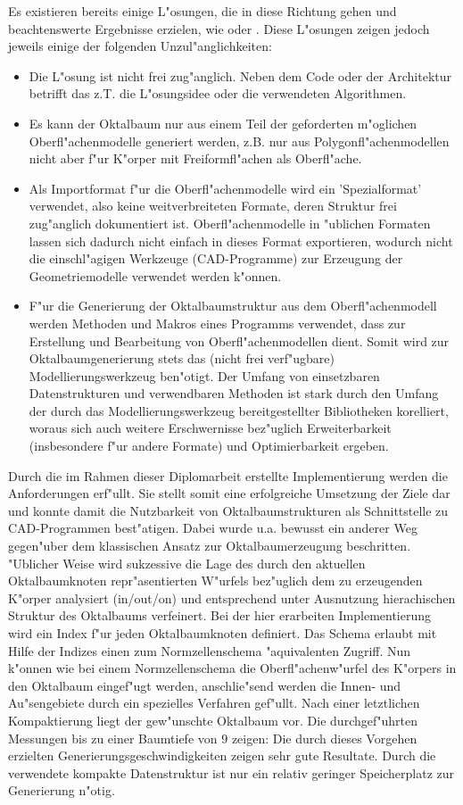 Es existieren bereits einige L"osungen, die in diese Richtung gehen und 
beachtenswerte Ergebnisse erzielen, wie \cite{dipl_anw_oct} oder
\cite{konvex_polygon_anw_oct}.
Diese L"osungen zeigen jedoch jeweils einige der folgenden
Unzul"anglichkeiten:
\begin{itemize}
\item Die L"osung ist nicht frei zug"anglich. Neben dem Code oder der 
    Architektur betrifft das z.T. die L"osungsidee oder die verwendeten
    Algorithmen.
\item Es kann der Oktalbaum nur aus einem Teil der geforderten m"oglichen 
    Oberfl"achenmodelle generiert werden, z.B. nur aus Polygonfl"achenmodellen 
    nicht aber f"ur K"orper mit Freiformfl"achen als Oberfl"ache.
\item Als Importformat f"ur die Oberfl"achenmodelle wird ein 'Spezialformat'
    verwendet, also keine weitverbreiteten Formate, deren Struktur frei 
    zug"anglich dokumentiert ist. Oberfl"achenmodelle in "ublichen Formaten 
    lassen sich dadurch nicht einfach in dieses Format exportieren, wodurch
    nicht die einschl"agigen Werkzeuge (CAD-Programme) zur Erzeugung der 
    Geometriemodelle verwendet werden k"onnen.
\item F"ur die Generierung der Oktalbaumstruktur aus dem Oberfl"achenmodell 
    werden Methoden und Makros eines Programms verwendet, dass zur Erstellung 
    und Bearbeitung von Oberfl"achenmodellen dient. Somit wird zur 
    Oktalbaumgenerierung stets das (nicht frei verf"ugbare) 
    Modellierungswerkzeug ben"otigt. Der Umfang von einsetzbaren 
    Datenstrukturen und verwendbaren Methoden ist stark durch den Umfang
    der durch das Modellierungswerkzeug bereitgestellter Bibliotheken
    korelliert, woraus sich auch weitere Erschwernisse bez"uglich 
    Erweiterbarkeit (insbesondere f"ur andere Formate) und Optimierbarkeit
    ergeben.
\end{itemize}
Durch die im Rahmen dieser Diplomarbeit erstellte Implementierung werden die 
Anforderungen erf"ullt. Sie stellt somit eine erfolgreiche Umsetzung der
Ziele dar und konnte damit die Nutzbarkeit von Oktalbaumstrukturen als 
Schnittstelle zu CAD-Programmen best"atigen. Dabei wurde u.a. bewusst ein 
anderer Weg gegen"uber dem klassischen Ansatz zur Oktalbaumerzeugung 
beschritten. "Ublicher Weise wird sukzessive die Lage des durch den aktuellen 
Oktalbaumknoten repr"asentierten W"urfels bez"uglich dem zu erzeugenden K"orper 
analysiert (in/out/on) und entsprechend unter Ausnutzung hierachischen 
Struktur des Oktalbaums verfeinert. Bei der hier erarbeiten Implementierung 
wird ein Index f"ur jeden Oktalbaumknoten definiert. Das Schema erlaubt mit 
Hilfe der Indizes einen zum Normzellenschema "aquivalenten Zugriff. Nun 
k"onnen wie bei einem Normzellenschema die Oberfl"achenw"urfel des K"orpers 
in den Oktalbaum eingef"ugt werden, anschlie"send werden die Innen- und 
Au"sengebiete durch ein spezielles Verfahren gef"ullt. Nach einer letztlichen 
Kompaktierung liegt der gew"unschte Oktalbaum vor. Die durchgef"uhrten 
Messungen bis zu einer Baumtiefe von $9$ zeigen: Die durch dieses Vorgehen 
erzielten Generierungsgeschwindigkeiten zeigen sehr gute Resultate. Durch die 
verwendete kompakte Datenstruktur ist nur ein relativ geringer Speicherplatz 
zur Generierung n"otig. 

